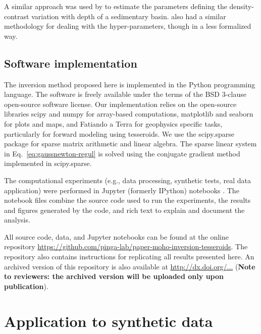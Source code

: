 \documentclass[extra]{gji}
\begin{document}
A similar approach was used by \citet{martins2010}
to estimate the parameters defining
the density-contrast variation with depth
of a sedimentary basin.
\citet{vandermeijde2013} also had
a similar methodology for dealing with the hyper-parameters,
though in a less formalized way.



\subsection{Software implementation}

The inversion method proposed here is implemented in the Python programming
language.
The software is freely available
under the terms of the BSD 3-clause open-source software license.
Our implementation relies on the open-source libraries
scipy and numpy \citep[][ \url{http://scipy.org}]{jones2001}
for array-based computations,
matplotlib \citep[][ \url{http://matplotlib.org}]{hunter2007}
and seaborn
\citep[][ \url{http://stanford.edu/~mwaskom/software/seaborn}]{waskom2015}
for plots and maps,
and Fatiando a Terra \citep[][ \url{http://www.fatiando.org}]{uieda2013}
for geophysics specific tasks,
particularly for forward modeling using tesseroids.
We use the scipy.sparse package for sparse matrix arithmetic and linear
algebra.
The sparse linear system in Eq.~\ref{eq:gaussnewton-regul}
is solved using the conjugate gradient method implemented in scipy.sparse.

The computational experiments
(e.g., data processing, synthetic tests, real data application)
were performed in
Jupyter (formerly IPython) notebooks
\citep[][ \url{http://jupyter.org/}]{perez2007}.
The notebook files combine the source code used to run the experiments,
the results and figures generated by the code,
and rich text to explain and document the analysis.

All source code, data, and Jupyter notebooks
can be found at the online repository
\url{https://github.com/pinga-lab/paper-moho-inversion-tesseroids}.
The repository also contains instructions for replicating all results presented
here.
An archived version of this repository is also available at
\url{http://dx.doi.org/...}
(\textbf{Note to reviewers: the archived version will be uploaded only upon
publication}).


\section{Application to synthetic data}
\end{document}
